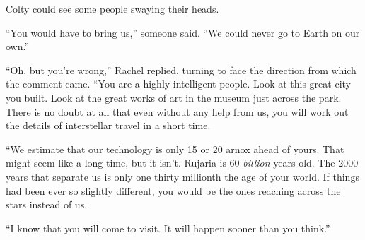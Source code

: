 Colty could see some people swaying their heads.

``You would have to bring us,'' someone said. ``We could never go to Earth on our own.''

``Oh, but you're wrong,'' Rachel replied, turning to face the direction from which the comment
came. ``You are a highly intelligent people. Look at this great city you built. Look at the
great works of art in the museum just across the park. There is no doubt at all that even
without any help from us, you will work out the details of interstellar travel in a short
time.

``We estimate that our technology is only 15 or 20 arnox ahead of yours. That might seem like a
long time, but it isn't. Rujaria is 60 \emph{billion} years old. The 2000 years that separate us
is only one thirty millionth the age of your world. If things had been ever so slightly
different, you would be the ones reaching across the stars instead of us.

``I know that you will come to visit. It will happen sooner than you think.''

